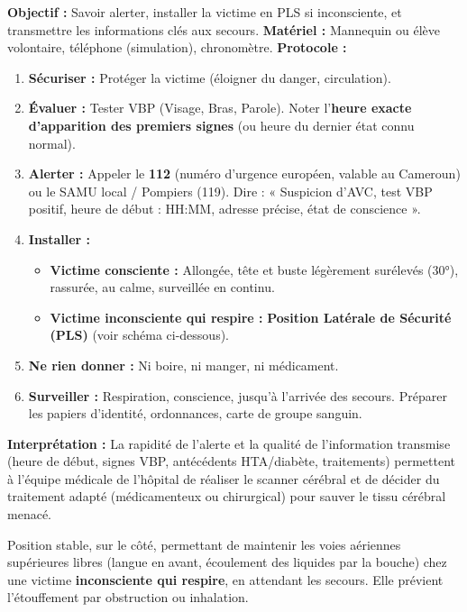 \documentclass[11pt]{article}
\begin{document}
\begin{experience}
\textbf{Objectif :} Savoir alerter, installer la victime en PLS si inconsciente, et transmettre les informations clés aux secours.
\textbf{Matériel :} Mannequin ou élève volontaire, téléphone (simulation), chronomètre.
\textbf{Protocole :}
\begin{enumerate}
    \item \textbf{Sécuriser :} Protéger la victime (éloigner du danger, circulation).
    \item \textbf{Évaluer :} Tester VBP (Visage, Bras, Parole). Noter l'\textbf{heure exacte d'apparition des premiers signes} (ou heure du dernier état connu normal).
    \item \textbf{Alerter :} Appeler le \textbf{112} (numéro d'urgence européen, valable au Cameroun) ou le SAMU local / Pompiers (119). Dire : « Suspicion d'AVC, test VBP positif, heure de début : HH:MM, adresse précise, état de conscience ».
    \item \textbf{Installer :}
        \begin{itemize}
            \item \textbf{Victime consciente :} Allongée, tête et buste légèrement surélevés (30°), rassurée, au calme, surveillée en continu.
            \item \textbf{Victime inconsciente qui respire :} \textbf{Position Latérale de Sécurité (PLS)} (voir schéma ci-dessous).
        \end{itemize}
    \item \textbf{Ne rien donner :} Ni boire, ni manger, ni médicament.
    \item \textbf{Surveiller :} Respiration, conscience, jusqu'à l'arrivée des secours. Préparer les papiers d'identité, ordonnances, carte de groupe sanguin.
\end{enumerate}
\textbf{Interprétation :} La rapidité de l'alerte et la qualité de l'information transmise (heure de début, signes VBP, antécédents HTA/diabète, traitements) permettent à l'équipe médicale de l'hôpital de réaliser le scanner cérébral et de décider du traitement adapté (médicamenteux ou chirurgical) pour sauver le tissu cérébral menacé.
\end{experience}

\begin{definition}
Position stable, sur le côté, permettant de maintenir les voies aériennes supérieures libres (langue en avant, écoulement des liquides par la bouche) chez une victime \textbf{inconsciente qui respire}, en attendant les secours. Elle prévient l'étouffement par obstruction ou inhalation.
\end{definition}
\end{document}
